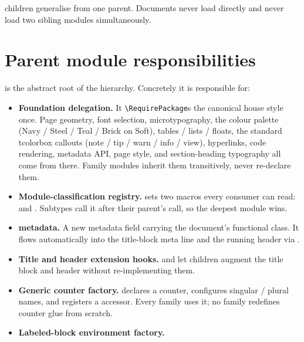 \documentclass[11pt]{article}
\begin{document}
 children
generalise from one parent. Documents never load 
directly and never load two sibling modules simultaneously.

\section{Parent module responsibilities}

 is the abstract root of the hierarchy.
Concretely it is responsible for:

\begin{itemize}
  \item \textbf{Foundation delegation.} It \texttt{\textbackslash RequirePackage}s the
        canonical house style  once. Page
        geometry, font selection, microtypography, the colour palette
        (Navy / Steel / Teal / Brick on Soft), tables / lists / floats,
        the standard tcolorbox callouts (note / tip / warn / info / view),
        hyperlinks, code rendering, metadata API, page style, and
        section-heading typography all come from there. Family modules
        inherit them transitively, never re-declare them.
  \item \textbf{Module-classification registry.}
         sets two macros every consumer can
        read:  and .
        Subtypes call it after their parent's call, so the deepest module
        wins.
  \item \textbf{ metadata.} A new metadata field carrying
        the document's functional class. It flows automatically into the
        title-block meta line and the running header via
        .
  \item \textbf{Title and header extension hooks.}
         and  let
        children augment the title block and header without
        re-implementing them.
  \item \textbf{Generic counter factory.}  declares
        a counter, configures  singular / plural names,
        and registers a  accessor. Every family
        uses it; no family redefines counter glue from scratch.
  \item \textbf{Labeled-block environment factory.}

\end{itemize}
\end{document}
